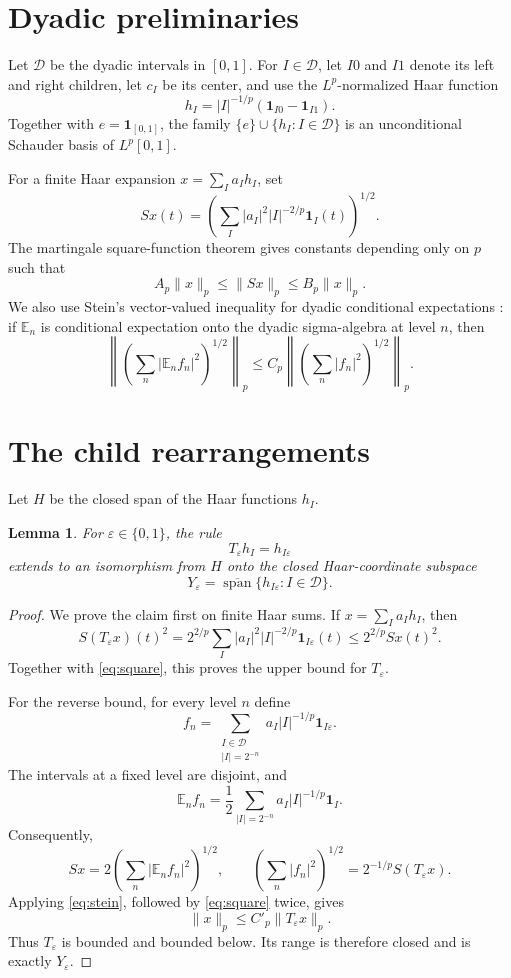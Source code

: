 \documentclass[11pt]{article}
\newtheorem{lemma}{Lemma}
\newcommand{\Lp}{L^p[0,1]}
\newcommand{\Dcal}{\mathcal D}
\newcommand{\Ecal}{\mathbb E}
\newcommand{\one}{\mathbf 1}
\begin{document}
\section{Dyadic preliminaries}

Let $\Dcal$ be the dyadic intervals in $[0,1]$. For $I\in\Dcal$, let $I0$
and $I1$ denote its left and right children, let $c_I$ be its center, and use
the $L^p$-normalized Haar function
\[
  h_I=|I|^{-1/p}(\one_{I0}-\one_{I1}).
\]
Together with $e=\one_{[0,1]}$, the family
$\{e\}\cup\{h_I:I\in\Dcal\}$ is an unconditional Schauder basis of $\Lp$.

For a finite Haar expansion $x=\sum_I a_Ih_I$, set
\[
  Sx(t)=\left(\sum_I |a_I|^2 |I|^{-2/p}\one_I(t)\right)^{1/2}.
\]
The martingale square-function theorem \cite{Stein} gives constants depending only on $p$
such that
\begin{equation}\label{eq:square}
  A_p\|x\|_p\le \|Sx\|_p\le B_p\|x\|_p.
\end{equation}
We also use Stein's vector-valued inequality for dyadic conditional
expectations \cite{Stein}: if $\Ecal_n$ is conditional expectation onto the
dyadic sigma-algebra at level $n$, then
\begin{equation}\label{eq:stein}
 \left\|\left(\sum_n|\Ecal_n f_n|^2\right)^{1/2}\right\|_p
 \le C_p
 \left\|\left(\sum_n|f_n|^2\right)^{1/2}\right\|_p.
\end{equation}

\section{The child rearrangements}

Let $H$ be the closed span of the Haar functions $h_I$.

\begin{lemma}\label{lem:child}
For $\varepsilon\in\{0,1\}$, the rule
\[
  T_\varepsilon h_I=h_{I\varepsilon}
\]
extends to an isomorphism from $H$ onto the closed Haar-coordinate subspace
\[
  Y_\varepsilon=\overline{\operatorname{span}}
  \{h_{I\varepsilon}:I\in\Dcal\}.
\]
\end{lemma}

\begin{proof}
We prove the claim first on finite Haar sums. If
$x=\sum_I a_Ih_I$, then
\[
 S(T_\varepsilon x)(t)^2
 =2^{2/p}\sum_I|a_I|^2|I|^{-2/p}\one_{I\varepsilon}(t)
 \le 2^{2/p}Sx(t)^2.
\]
Together with \eqref{eq:square}, this proves the upper bound for
$T_\varepsilon$.

For the reverse bound, for every level $n$ define
\[
 f_n=\sum_{\substack{I\in\Dcal\\ |I|=2^{-n}}}
 a_I|I|^{-1/p}\one_{I\varepsilon}.
\]
The intervals at a fixed level are disjoint, and
\[
 \Ecal_n f_n=\frac12
 \sum_{|I|=2^{-n}}a_I|I|^{-1/p}\one_I.
\]
Consequently,
\[
 Sx=2\left(\sum_n|\Ecal_n f_n|^2\right)^{1/2},
 \qquad
 \left(\sum_n|f_n|^2\right)^{1/2}
 =2^{-1/p}S(T_\varepsilon x).
\]
Applying \eqref{eq:stein}, followed by \eqref{eq:square} twice, gives
\[
 \|x\|_p\le C'_p\|T_\varepsilon x\|_p.
\]
Thus $T_\varepsilon$ is bounded and bounded below. Its range is therefore
closed and is exactly $Y_\varepsilon$.
\end{proof}
\end{document}
